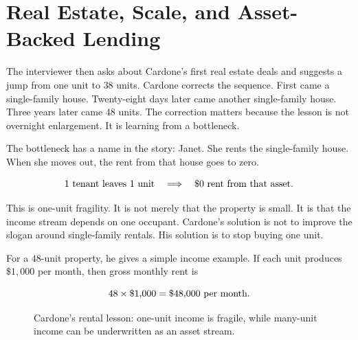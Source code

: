 \section{Real Estate, Scale, and Asset-Backed Lending}

The interviewer then asks about Cardone's first real estate deals and suggests a jump from one unit to \(38\) units. Cardone corrects the sequence. First came a single-family house. Twenty-eight days later came another single-family house. Three years later came \(48\) units. The correction matters because the lesson is not overnight enlargement. It is learning from a bottleneck.

The bottleneck has a name in the story: Janet. She rents the single-family house. When she moves out, the rent from that house goes to zero.

\begin{equation}
1\hbox{ tenant leaves }1\hbox{ unit}
\quad \Longrightarrow \quad
\$0\hbox{ rent from that asset}.
\end{equation}

This is one-unit fragility. It is not merely that the property is small. It is that the income stream depends on one occupant. Cardone's solution is not to improve the slogan around single-family rentals. His solution is to stop buying one unit.

For a \(48\)-unit property, he gives a simple income example. If each unit produces \(\$1{,}000\) per month, then gross monthly rent is

\begin{equation}
48\times \$1{,}000=\$48{,}000\hbox{ per month}.
\end{equation}

\begin{figure}
\centering
{}
\caption{Cardone's rental lesson: one-unit income is fragile, while many-unit income can be underwritten as an asset stream.}
\end{figure}

